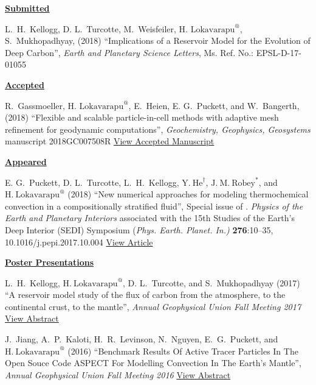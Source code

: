 \documentclass[11pt]{ltxdoc}
\begin{document}

\noindent
\textbf{\underline{Submitted}}


\hangindent 20pt
L.~H.~Kellogg, D. L.~Turcotte, M.~Weisfeiler, $\textrm{H.~Lokavarapu}^@$, S.~Mukhopadhyay, (2018) 
``Implications of a Reservoir Model for the
Evolution of Deep Carbon'', 
\textit{Earth and Planetary Science Letters}, Ms. Ref. No.:  EPSL-D-17-01055


\noindent
\textbf{\underline{Accepted}}

\hangindent 20pt
R.~Gassmoeller,  $\textrm{H.~Lokavarapu}^@$, E.~Heien, E. G.~Puckett, and W.~Bangerth, (2018) 
``Flexible and scalable particle-in-cell methods with adaptive mesh refinement for geodynamic computations'', 
\textit{Geochemistry, Geophysics, Geosystems} manuscript 2018GC007508R 
\href{https://www.math.ucdavis.edu/~egp/PUBLICATIONS/JOURNAL_ARTICLES/ACCEPTED/RG-HL-EH-EGP-WB-2018.pdf}{View Accepted Manuscript}

\noindent
\textbf{\underline{Appeared}}

\vskip 06pt


\hangindent 20pt
E. G.~Puckett, D. L.~Turcotte, L.~H.~Kellogg,  $\mathrm{Y.~He}^{\dagger}$, $\mathrm{J.~M.~Robey}^{*}$, and 
$\mathrm{H.~Lokavarapu}^{@}$ (2018)
``New numerical approaches for modeling thermochemical convection in a compositionally stratified fluid'', 
Special issue of . \textit{Physics of the Earth and Planetary Interiors} associated with the 15th Studies of the Earth's Deep Interior (SEDI) Symposium (\textit{Phys. Earth. Planet. In.)} \textbf{276}:10–35, 10.1016/j.pepi.2017.10.004
\href{https://www.math.ucdavis.edu/~egp/PUBLICATIONS/JOURNAL_ARTICLES/APPEARED/2018/EGP-DLT-YH-HL-JMR-LHK-2018.pdf}{View Article}

\noindent
\textbf{\underline{Poster Presentations}}


\hangindent 20pt
L.~H.~Kellogg, $\mathrm{H.~Lokavarapu}^{@}$, D. L.~Turcotte, and S.~Mukhopadhyay (2017) 
``A reservoir model study of the flux of carbon from the atmosphere, to the continental crust, to the mantle'', 
\textit{Annual Geophysical Union Fall Meeting 2017}
\href{http://adsabs.harvard.edu/abs/2017AGUFMDI14A..06K}{View Abstract}

\hangindent 20pt
J.~Jiang, A.~P.~Kaloti, H.~R.~Levinson, N.~Nguyen, E.~G.~Puckett, and $\mathrm{H.~Lokavarapu}^{@}$ (2016) 
``Benchmark Results Of Active Tracer Particles In The Open Souce Code ASPECT For Modelling Convection In The Earth's Mantle'', 
\textit{Annual Geophysical Union Fall Meeting 2016}
\href{http://adsabs.harvard.edu/abs/2016AGUFM.T23C2946J}{View Abstract}
\end{document}
